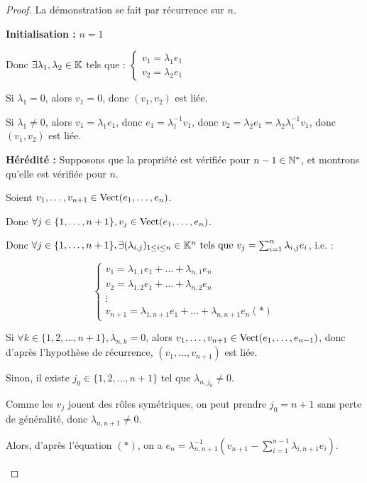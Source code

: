 \documentclass[12pt,a4paper]{report}
\begin{document}
\begin{proof}
    La démonstration se fait par récurrence sur $n$.

    \textbf{Initialisation :} $n=1$

    Donc $\exists \lambda_1,\lambda_2 \in \mathbb{K}$ tels que : $\displaystyle\begin{cases}
    v_1 = \lambda_1 e_1\\
    v_2 = \lambda_2 e_1
    \end{cases}$

    Si $\lambda_1 = 0$, alors $v_1 = 0$, donc $(v_1,v_2)$ est liée.

    Si $\lambda_1 \ne 0$, alors $v_1 = \lambda_1 e_1$, donc $e_1 = \lambda_1^{-1} v_1$, donc $v_2 = \lambda_2 e_1 = \lambda_2 \lambda_1^{-1} v_1$, donc $(v_1,v_2)$ est liée.

    \textbf{Hérédité :} Supposons que la propriété est vérifiée pour $n-1 \in \mathbb{N}^*$, et montrons qu'elle est vérifiée pour $n$.

    \begin{outline}
        \1 Soient $v_1,\dots,v_{n+1} \in \mathrm{Vect}(e_1,\dots,e_n)$.
    
        \1 Donc $\forall j \in \{1,\dots,n+1\}, v_j \in \mathrm{Vect}(e_1,\dots,e_n)$.

        \1 Donc $\forall j \in \{1,\dots,n+1\}, \exists (\lambda_{i,j})_{1 \le i \le n} \in \mathbb{K}^n \text{ tels que } v_j = \sum_{i=1}^n \lambda_{i,j} e_i$, i.e. :

        $$\begin{cases}
v_1 = \lambda_{1,1} e_1 + \dots + \lambda_{n,1} e_n\\
v_2 = \lambda_{1,2} e_1 + \dots + \lambda_{n,2} e_n\\
\vdots\\
v_{n+1} = \lambda_{1,n+1} e_1 + \dots + \lambda_{n,n+1} e_n (*)
        \end{cases}$$

        \1 Si $\forall k \in \{1,2,\dots,n+1\}, \lambda_{n,k} = 0$, alors $v_1,\dots,v_{n+1} \in \mathrm{Vect}(e_1,\dots,e_{n-1})$, donc d'après l'hypothèse de récurrence, $(v_1,\dots,v_{n+1})$ est liée.

        \1 Sinon, il existe $j_0 \in \{1,2,\dots,n+1\}$ tel que $\lambda_{n,j_0} \ne 0$.

        \1 Comme les $v_j$ jouent des rôles symétriques, on peut prendre $j_0 = n+1$ sans perte de généralité, donc $\lambda_{n,n+1} \ne 0$.

        \1 Alors, d'après l'équation $(*)$, on a $e_n = \lambda_{n,n+1}^{-1} \left(v_{n+1} - \sum_{i=1}^{n-1} \lambda_{i,n+1} e_i\right)$.


\end{outline}
\end{proof}
\end{document}
